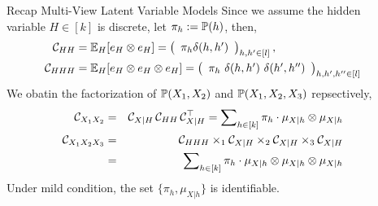 \documentclass[final,t]{beamer}
\begin{document}
\begin{frame}{}
\begin{columns}[t]
\begin{column}{.3\linewidth}
\begin{block}{Recap Multi-View Latent Variable Models}
      Since we assume the hidden variable $H \in [k]$ is discrete, let $\pi_h:=\mathbb{P}(h)$, then,
         \begin{align*}
         \mathcal{C}_{HH} &= \mathbb{E}_H[e_H \otimes e_H] = \left(
          \begin{array}{c}
            \pi_h \delta(h, h') \cr
          \end{array}
         \right)_{h,h' \in [l]},\\
         \mathcal{C}_{HHH} &= \mathbb{E}_H[e_H \otimes e_H \otimes e_H] 
          = \left(
          \begin{array}{c}
            \pi_h\ \delta(h,h')\ \delta(h',h'') \cr
          \end{array}
         \right)_{h,h',h''\in[l]}
        \end{align*}
      We obatin the factorization of $\mathbb{P}(X_1,X_2)$ and $\mathbb{P}(X_1,X_2,X_3)$ repsectively,
      \begin{eqnarray*}
        \mathcal{C}_{X_1X_2}&=& \mathcal{C}_{X|H}\, \mathcal{C}_{HH}\, \mathcal{C}_{X|H}^\top=\sum\nolimits_{h \in [k]} \pi_h\cdot \mu_{X|h} \otimes \mu_{X|h}\\
        \mathcal{C}_{X_1 X_2 X_3} &=& \mathcal{C}_{HHH} \times_1 \mathcal{C}_{X|H} \times_2 \mathcal{C}_{X|H} \times_3 \mathcal{C}_{X|H}\\
        &=&\sum\nolimits_{h \in [k]} \pi_h\cdot \mu_{X|h} \otimes \mu_{X|h} \otimes \mu_{X|h}
      \end{eqnarray*}
      Under mild condition, the set $\{\pi_h, \mu_{X|h}\}$ is \alert{identifiable}.
      \end{block}

      \vspace{-0.5in}
    \end{column}


    \begin{column}{.3\linewidth}



\end{column}
\end{columns}
\end{frame}
\end{document}
